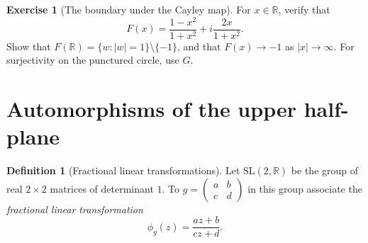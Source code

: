 \documentclass[11pt]{article}
\theoremstyle{plain}
\theoremstyle{definition}
\newtheorem{definition}[theorem]{Definition}
\newtheorem{exercise}[theorem]{Exercise}
\theoremstyle{boldremark}
\theoremstyle{remark}
\numberwithin{equation}{section}
\newcommand{\R}{\mathbb{R}}
\newenvironment{lecturefigure}
 {\par\addvspace{0.25em}\begingroup\setlength{\parskip}{0pt}\centering}
 {\par\endgroup\addvspace{0.25em}}
\begin{document}
\begin{lecturefigure}
\end{lecturefigure}

\begin{exercise}[The boundary under the Cayley map]
For $x\in\R$, verify that
\begin{equation}
 F(x)=\frac{1-x^2}{1+x^2}+i\frac{2x}{1+x^2}.
\end{equation}
Show that $F(\R)=\{w:|w|=1\}\setminus\{-1\}$, and that
$F(x)\to-1$ as $|x|\to\infty$. For surjectivity on the punctured
circle, use $G$.
\end{exercise}

\section{Automorphisms of the upper half-plane}

\begin{definition}[Fractional linear transformations]
Let $\mathrm{SL}(2,\R)$ be the group of real $2\times2$ matrices of
determinant $1$. To $g=\left(\begin{smallmatrix}a&b\\c&d\end{smallmatrix}\right)$
in this group associate the \emph{fractional linear transformation}
\begin{equation}
 \phi_g(z)=\frac{az+b}{cz+d}.
\end{equation}
\end{definition}
\end{document}
